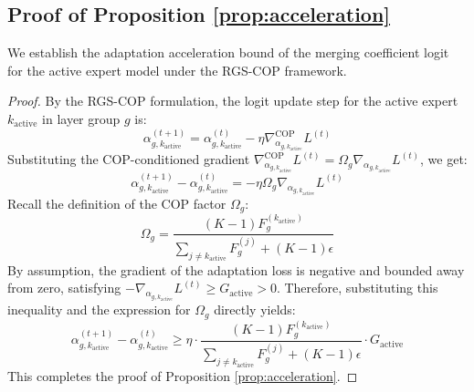 \documentclass{article}
\theoremstyle{plain}
\theoremstyle{definition}
\theoremstyle{remark}
\begin{document}
\subsection{Proof of Proposition \ref{prop:acceleration}}
We establish the adaptation acceleration bound of the merging coefficient logit for the active expert model under the RGS-COP framework.

\begin{proof}
By the RGS-COP formulation, the logit update step for the active expert $k_{\text{active}}$ in layer group $g$ is:
\begin{equation}
    \alpha^{(t+1)}_{g, k_{\text{active}}} = \alpha^{(t)}_{g, k_{\text{active}}} - \eta \nabla^{\text{COP}}_{\alpha_{g, k_{\text{active}}}} L^{(t)}
\end{equation}
Substituting the COP-conditioned gradient $\nabla^{\text{COP}}_{\alpha_{g, k_{\text{active}}}} L^{(t)} = \Omega_g \nabla_{\alpha_{g, k_{\text{active}}}} L^{(t)}$, we get:
\begin{equation}
    \alpha^{(t+1)}_{g, k_{\text{active}}} - \alpha^{(t)}_{g, k_{\text{active}}} = -\eta \Omega_g \nabla_{\alpha_{g, k_{\text{active}}}} L^{(t)}
\end{equation}
Recall the definition of the COP factor $\Omega_g$:
\begin{equation}
    \Omega_g = \frac{(K-1)F^{(k_{\text{active}})}_g}{\sum_{j \neq k_{\text{active}}} F^{(j)}_g + (K-1)\epsilon}
\end{equation}
By assumption, the gradient of the adaptation loss is negative and bounded away from zero, satisfying $-\nabla_{\alpha_{g, k_{\text{active}}}} L^{(t)} \geq G_{\text{active}} > 0$. Therefore, substituting this inequality and the expression for $\Omega_g$ directly yields:
\begin{equation}
    \alpha^{(t+1)}_{g, k_{\text{active}}} - \alpha^{(t)}_{g, k_{\text{active}}} \geq \eta \cdot \frac{(K-1) F^{(k_{\text{active}})}_g}{\sum_{j \neq k_{\text{active}}} F^{(j)}_g + (K-1)\epsilon} \cdot G_{\text{active}}
\end{equation}
This completes the proof of Proposition \ref{prop:acceleration}.
\end{proof}
\end{document}
